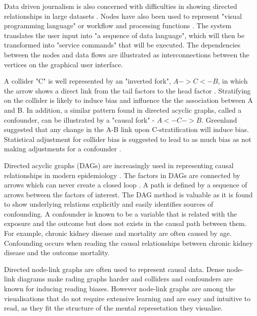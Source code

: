 \documentclass{l4proj}
\begin{document}
Data driven journalism is also concerned with difficulties in showing directed relationships in large datasets \cite{niederer2015survey}. Nodes have also been used to represent "visual programming language" or workflow and processing functions \cite{thattai2016systems}. The system translates the user input into "a sequence of data language", which will then be transformed into "service commands" that will be executed. The dependencies between the nodes and data flows are illustrated as interconnections between the vertices on the graphical user interface. 

A collider "C" is well represented by an "inverted fork", $A->C<-B$, in which the arrow shows a direct link from the tail factors to the head factor \cite{greenland2003quantifying}. Stratifying on the collider is likely to induce bias and influence the the association between A and B. In addition, a similar pattern found in directed acyclic graphs, called a confounder, can be illustrated by a "causal fork" - $A<-C-> B$. Greenland \cite{greenland2003quantifying} suggested that any change in the A-B link upon C-stratification will induce bias. Statistical adjustment for collider bias is suggested to lead to as much bias as not making adjustments for a confounder \cite{janszky2010janus}. 

Directed acyclic graphs (DAGs) are increasingly used in representing causal relationships in modern epidemiology \cite{suttorp2015graphical}. The factors in DAGs are connected by arrows which can never create a closed loop \cite{greenland1999causal}. A path is defined by a sequence of arrows between the factors of interest. The DAG method is valuable as it is found to show underlying relations explicitly and easily identifies sources of confounding. A confounder is known to be a variable that is related with the exposure and the outcome but does not exists in the causal path between them. For example, chronic kidney disease and mortality are often caused by age. Confounding occurs when reading the causal relationships between chronic kidney disease and the outcome mortality. 

Directed node-link graphs are often used to represent causal data. Dense node-link diagrams make rading graphs harder and colliders and confounders are known for inducing reading biases. However node-link graphs are among the visualisations that do not require extensive learning and are easy and intuitive to read, as they fit the structure of the mental represetation they visualise\cite{netzel2014comparative}.
\end{document}
